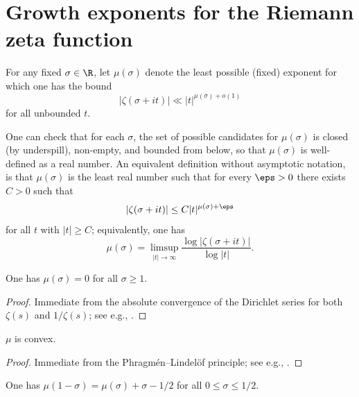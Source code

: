 \chapter{Growth exponents for the Riemann zeta function}\label{zeta-growth-chapter}

\begin{definition}\label{zeta-grow-def}  For any fixed $\sigma \in \R$, let $\mu(\sigma)$ denote the least possible (fixed) exponent for which one has the bound
    $$ |\zeta(\sigma+it)| \ll |t|^{\mu(\sigma)+o(1)}$$
    for all unbounded $t$.
\end{definition}

One can check that for each $\sigma$, the set of possible candidates for $\mu(\sigma)$ is closed (by underspill), non-empty, and bounded from below, so that $\mu(\sigma)$ is well-defined as a real number.  An equivalent definition without asymptotic notation, is that $\mu(\sigma)$ is the least real number such that for every $\eps>0$ there exists $C>0$ such that
$$ |\zeta(\sigma+it)| \leq C |t|^{\mu(\sigma)+\eps}$$
for all $t$ with $|t| \geq C$; equivalently, one has
$$ \mu(\sigma) = \limsup_{|t| \to \infty} \frac{\log |\zeta(\sigma+it)|}{\log|t|}.$$


\begin{lemma}\label{zeta-grow-triv}
    One has $\mu(\sigma)=0$ for all $\sigma \geq 1$.
\end{lemma}


\begin{proof}  Immediate from the absolute convergence of the Dirichlet series for both $\zeta(s)$ and $1/\zeta(s)$; see e.g., \cite[Theorem 1.9]{ivic}.
\end{proof}

\begin{lemma}[Convexity]\label{zeta-convex}
$\mu$ is convex.
\end{lemma}


\begin{proof} Immediate from the Phragm\'en--Lindel\"of principle; see e.g., \cite[\S A.8]{ivic}.
\end{proof}

\begin{lemma}\label{zeta-functional}
    One has $\mu(1-\sigma) = \mu(\sigma) + \sigma - 1/2$ for all $0 \leq \sigma \leq 1/2$.
\end{lemma}

